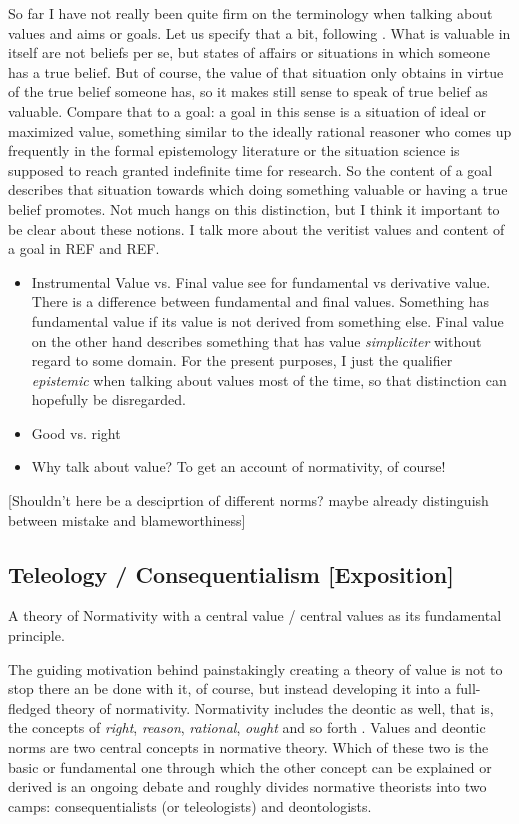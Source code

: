 \documentclass[12pt,numbers=noenddot]{scrartcl}
\begin{document}
So far I have not really been quite firm on the terminology when talking about values and aims or goals. Let us specify that a bit, following \textcite[344f.]{Berker2013-BERETA-2}. What is valuable in itself are not beliefs per se, but states of affairs or situations in which someone has a true belief. But of course, the value of that situation only obtains in virtue of the true belief someone has, so it makes still sense to speak of true belief as valuable. Compare that to a goal: a goal in this sense is a situation of ideal or maximized value, something similar to the ideally rational reasoner who comes up frequently in the formal epistemology literature or the situation science is supposed to reach granted indefinite time for research. So the content of a goal describes that situation towards which doing something valuable or having a true belief promotes. Not much hangs on this distinction, but I think it important to be clear about these notions. I talk more about the veritist values and content of a goal in REF and REF.
\begin{itemize}
    \item{ Instrumental Value vs. Final value }
    see \textcite{Sosa2007-SOSAVE-2} for fundamental vs derivative value. There is a difference between fundamental and final values. Something has fundamental value if its value is not derived from something else. Final value on the other hand describes something that has value \emph{simpliciter} without regard to some domain. For the present purposes, I just the qualifier \emph{epistemic} when talking about values most of the time, so that distinction can hopefully be disregarded.
    \item{ Good vs. right }
    \item{ Why talk about value? To get an account of normativity, of course! }
\end{itemize}

[Shouldn't here be a desciprtion of different norms? maybe already distinguish between mistake and blameworthiness]

\subsection{ Teleology / Consequentialism [Exposition]} \label{subsec: teleology}
A theory of Normativity with a central value / central values as its fundamental principle.

The guiding motivation behind painstakingly creating a theory of value is not to stop there an be done with it, of course, but instead developing it into a 
full-fledged theory of normativity. Normativity includes the deontic as well, that is, the concepts of \emph{right}, \emph{reason}, \emph{rational}, \emph{ought} and so forth \autocite[21]{sep-value-theory}. Values and deontic norms are two central concepts in normative theory. Which of these two is the basic or fundamental one through which the other concept can be explained or derived is an ongoing debate and roughly divides normative theorists into two camps: consequentialists (or teleologists) and deontologists. 
\end{document}
